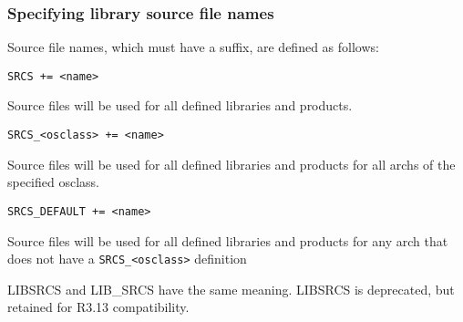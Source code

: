 \subsubsection{Specifying library source file names}

Source file names, which must have a suffix, are defined as follows:

\begin{description}
\item {}\verb|SRCS += <name>|

Source files will be used for all defined libraries and products.

\item \verb|SRCS_<osclass> += <name>|

Source files will be used for all defined libraries and products for all archs of the specified osclass.

\item \verb|SRCS_DEFAULT += <name>|

Source files will be used for all defined libraries and products for any arch that does not have a 
\verb|SRCS_<osclass>| definition

\end{description}

LIBSRCS and LIB\_SRCS have the same meaning. LIBSRCS is deprecated, but retained for R3.13 compatibility.

